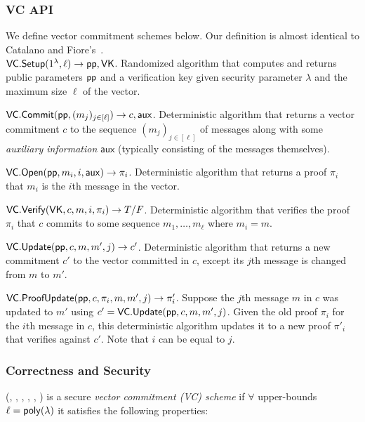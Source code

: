 \subsubsection{VC API}
We define vector commitment schemes below.
Our definition is almost identical to Catalano and Fiore's~\cite{CF13}.
\\

\api $\mathsf{VC.Setup}(1^\lambda, \ell)\rightarrow \mathsf{pp},\mathsf{VK}$.
Randomized algorithm that computes and returns public parameters $\mathsf{pp}$ and a verification key \vk given security parameter $\lambda$ and the maximum size $\ell$ of the vector.

\api $\mathsf{VC.Commit}(\mathsf{pp}, (m_j)_{j\in[\ell]}) \rightarrow c,\mathsf{aux}$.
Deterministic algorithm that returns a vector commitment $c$ to the sequence $(m_j)_{j\in[\ell]}$ of messages along with some \textit{auxiliary information} $\mathsf{aux}$ (typically consisting of the messages themselves).

\api $\mathsf{VC.Open}(\mathsf{pp}, m_i, i, \mathsf{aux}) \rightarrow \pi_i$.
Deterministic algorithm that returns a proof $\pi_i$ that $m_i$ is the $i$th message in the vector.

\api $\mathsf{VC.Verify}(\mathsf{VK}, c, m, i, \pi_i) \rightarrow T/F$.
Deterministic algorithm that verifies the proof $\pi_i$ that $c$ commits to some sequence $m_1, \dots, m_\ell$ where $m_i = m$.

\api $\mathsf{VC.Update}(\mathsf{pp}, c, m, m', j)\rightarrow c'$.
Deterministic algorithm that returns a new commitment $c'$ to the vector committed in $c$, except its $j$th message is changed from $m$ to $m'$.

\api $\mathsf{VC.ProofUpdate}(\mathsf{pp}, c, \pi_i, m, m', j)\rightarrow \pi'_i$.
Suppose the $j$th message $m$ in $c$ was updated to $m'$ using $c' = \mathsf{VC.Update}(\mathsf{pp},c,m,m',j)$.
Given the old proof $\pi_i$ for the $i$th message in $c$, this deterministic algorithm updates it to a new proof $\pi'_i$ that verifies against $c'$.
Note that $i$ can be equal to $j$.

\subsubsection{Correctness and Security}

\begin{definition}
    \label{def:vc}
    (\vcsetup, \vccommit, \vcopen, \vcverify, \vcupdate, \vcproofupdate) is a secure \textit{vector commitment (VC) scheme} if
    $\forall$ upper-bounds $\ell=\mathsf{poly}(\lambda)$
    it satisfies the following properties:
\end{definition}

